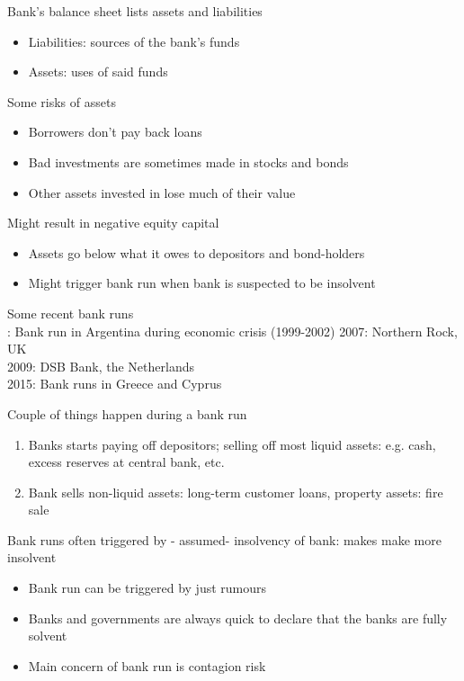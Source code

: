 \documentclass{beamer}
\begin{document}
\begin{frame}
 Bank's balance sheet lists assets and liabilities  
\begin{itemize}
  \item Liabilities: sources of the bank's funds
  \item Assets: uses of said funds
\end{itemize}
\end{frame}

\begin{frame}
 Some risks of assets
\begin{itemize}
  \item Borrowers don't pay back loans
  \item Bad investments are sometimes made in stocks and bonds
  \item Other assets invested in lose much of their value
\end{itemize}
\medskip
 Might result in negative equity capital
 \begin{itemize}
   \item Assets go below what it owes to depositors and bond-holders
   \item Might trigger bank run when bank is suspected to be insolvent
 \end{itemize}  
\end{frame}

\begin{frame}
 Some recent bank runs\\
 : Bank run in Argentina during economic crisis (1999-2002)
 2007: Northern Rock, UK\\
 2009: DSB Bank, the Netherlands\\
 2015: Bank runs in Greece and Cyprus
\end{frame}

\begin{frame}
  Couple of things happen during a bank run 
\begin{enumerate}
  \item Banks starts paying off depositors; selling off most liquid assets: e.g. cash, excess reserves at central bank, etc.
  \item Bank sells non-liquid assets: long-term customer loans, property assets: fire sale
\end{enumerate}
 \medskip
 Bank runs often triggered by - assumed- insolvency of bank: makes make more insolvent
 \begin{itemize}
   \item Bank run can be triggered by just rumours
   \item Banks and governments are always quick to declare that the banks are fully solvent
   \item Main concern of bank run is contagion risk
 \end{itemize}
\end{frame}
\end{document}
